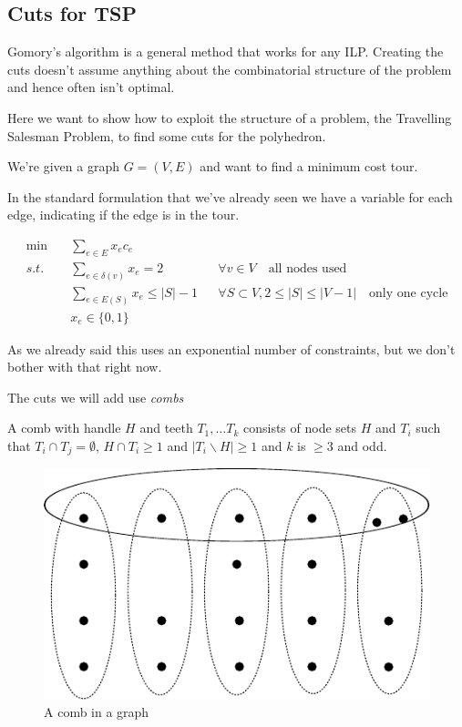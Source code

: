 \subsection{Cuts for TSP}

Gomory's algorithm is a general method that works for any ILP. Creating the cuts doesn't assume anything about the combinatorial structure of the problem and hence often isn't optimal.

Here we want to show how to exploit the structure of a problem, the Travelling Salesman Problem, to find some cuts for the polyhedron.

We're given a graph $G=(V,E)$ and want to find a minimum cost tour. 

In the standard formulation that we've already seen we have a variable for each edge, indicating if the edge is in the tour.

\begin{align*}
\min \quad & \sum_{e\in E} x_e c_e\\
s.t.\quad & \sum_{e\in \delta(v)} x_e = 2 && \forall v\in V \quad \text{all nodes used}\\
	& \sum_{e\in E(S)} x_e \leq |S|-1 && \forall S\subset V, 2\leq |S| \leq |V-1| \quad \text{only one cycle}\\
	& x_e \in \{0,1\}
\end{align*}

As we already said this uses an exponential number of constraints, but we don't bother with that right now.

The cuts we will add use \emph{combs}

\begin{Def}[Comb] %
A comb with handle $H$ and teeth $T_1,\ldots T_k$ consists of node sets $H$ and $T_i$ such that $T_i \cap T_j = \emptyset$, $H\cap T_i\geq 1$ and $|T_i\backslash H |\geq 1$ and $k$ is $\geq 3$ and odd.
\end{Def}

\begin{figure}[hbt]
\begin{center}
\includegraphics{./images/comb}
\end{center}
\caption{A comb in a graph}
\end{figure}

